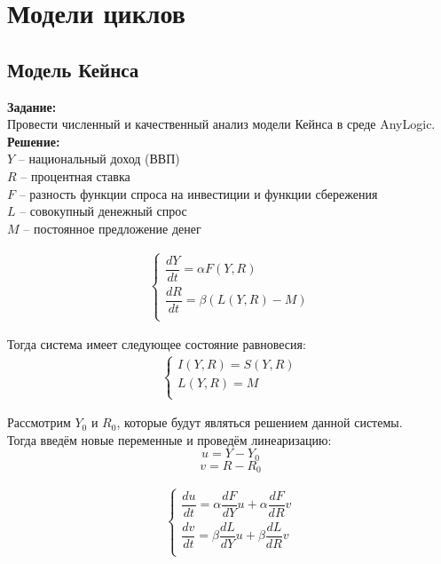 \section*{Модели циклов}
\subsection*{Модель Кейнса}

\textbf{Задание:}\\
Провести численный и качественный анализ модели Кейнса в среде AnyLogic.\\

\textbf{Решение:}\\
$Y$ -- национальный доход (ВВП)\\
$R$ -- процентная ставка\\
$F$ -- разность функции спроса на инвестиции и функции сбережения\\
$L$ -- совокупный денежный спрос\\
$M$ -- постоянное предложение денег

\begin{align*}
	\begin{cases}
		\dfrac{dY}{dt} = \alpha F(Y, R)\\[10pt]
		\dfrac{dR}{dt} = \beta(L(Y, R) - M)\\
	\end{cases}
\end{align*}

Тогда система имеет следующее состояние равновесия:
\begin{align*}
	\begin{cases}
		I(Y, R) = S(Y, R)\\
		L(Y, R) = M\\
	\end{cases}
\end{align*}

Рассмотрим $Y_0$ и $R_0$, которые будут являться решением данной системы.\\

Тогда введём новые переменные и проведём линеаризацию:
\[ u = Y - Y_0 \]
\[ v = R - R_0 \]

\begin{align*}
	\begin{cases}
		\dfrac{du}{dt} = \alpha \dfrac{dF}{dY} u + \alpha \dfrac{dF}{dR} v\\[10pt]
		\dfrac{dv}{dt} = \beta \dfrac{dL}{dY} u + \beta \dfrac{dL}{dR} v\\
	\end{cases}
\end{align*}


